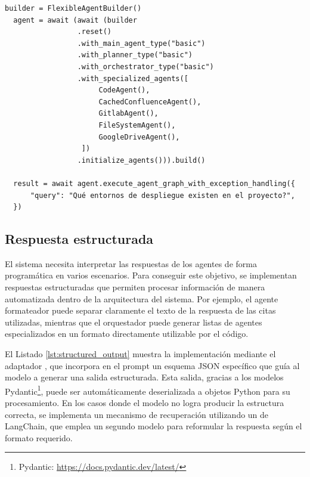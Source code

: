 \begin{lstlisting}[caption={Instanciación y ejecución del sistema mínimo con el patrón Builder},label={lst:builder}]
  builder = FlexibleAgentBuilder()
  agent = await (await (builder
                 .reset()
                 .with_main_agent_type("basic")
                 .with_planner_type("basic")
                 .with_orchestrator_type("basic")
                 .with_specialized_agents([
                      CodeAgent(),
                      CachedConfluenceAgent(),
                      GitlabAgent(),
                      FileSystemAgent(),
                      GoogleDriveAgent(),
                  ])
                 .initialize_agents())).build()

  result = await agent.execute_agent_graph_with_exception_handling({
      "query": "Qué entornos de despliegue existen en el proyecto?",
  })
\end{lstlisting}

\subsection{Respuesta estructurada}
El sistema necesita interpretar las respuestas de los agentes de forma programática en varios escenarios. Para conseguir este objetivo, se implementan respuestas estructuradas que permiten procesar información de manera automatizada dentro de la arquitectura del sistema. Por ejemplo, el agente formateador puede separar claramente el texto de la respuesta de las citas utilizadas, mientras que el orquestador puede generar listas de agentes especializados en un formato directamente utilizable por el código.

El Listado \ref{lst:structured_output} muestra la implementación mediante el adaptador , que incorpora en el prompt un esquema JSON específico que guía al modelo a generar una salida estructurada. Esta salida, gracias a los modelos Pydantic\footnote{Pydantic: \url{https://docs.pydantic.dev/latest/}}, puede ser automáticamente deserializada a objetos Python para su procesamiento. En los casos donde el modelo no logra producir la estructura correcta, se implementa un mecanismo de recuperación utilizando un  de LangChain, que emplea un segundo modelo para reformular la respuesta según el formato requerido.

